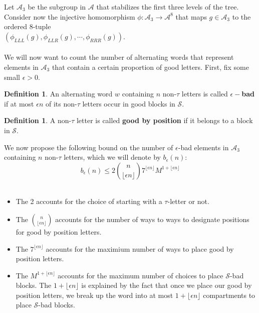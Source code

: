 \documentclass[11pt]{amsart}
\theoremstyle{definition}
\newtheorem{definition}[theorem]{Definition}
\theoremstyle{remark}
\numberwithin{equation}{section}
\begin{document}
\noindent Let $\mathcal{A}_3$ be the subgroup in $\mathcal{A}$ that stabilizes the first three levels of the tree. Consider now the injective homomorphism $\phi \colon \mathcal{A}_3 \to \mathcal{A}^{8}$ that maps $g \in \mathcal{A}_3$ to the ordered 8-tuple \\ $(\phi_{LLL}(g), \phi_{LLR}(g), \cdots, \phi_{RRR}(g))$. \\ \\
We will now want to count the number of alternating words that represent elements in $\mathcal{A}_3$ that contain a certain proportion of good letters. First, fix some small $\epsilon > 0$. 
\begin{definition}
An alternating word $w$ containing $n$ non-$\tau$ letters is called \textbf{$\epsilon-$bad} if at most $\epsilon n$ of its non-$\tau$ letters occur in good blocks in $\mathcal{S}$. 
\end{definition}
\begin{definition}
A non-$\tau$ letter is called \textbf{good by position} if it belongs to a block in $\mathcal{S}$.
\end{definition}
We now propose the following bound on the number of $\epsilon$-bad elements in $\mathcal{A}_3$ containing $n$ non-$\tau$ letters, which we will denote by $b_{\epsilon}(n)$: \\ 
$$b_{\epsilon}(n) \leq 2 \displaystyle{ n \choose \lfloor \epsilon n \rfloor } 7^{ \lfloor \epsilon n \rfloor } M^{1 + \lfloor \epsilon n \rfloor} $$ \\ 
\begin{itemize}
\item The 2 accounts for the choice of starting with a $\tau$-letter or not. \\ 
\item The $\displaystyle{ n \choose \lfloor \epsilon n \rfloor }$ accounts for the number of ways to ways to designate positions for good by position letters. \\
\item The $7^{ \lfloor \epsilon n \rfloor }$ accounts for the maximium number of ways to place good by position letters. \\ 
\item The $M^{1 + \lfloor \epsilon n \rfloor}$ accounts for the maximum number of choices to place $\mathcal{S}$-bad blocks. The $1 + \lfloor \epsilon n \rfloor$ is explained by the fact that once we place our good by position letters, we break up the word into at most $1 + \lfloor \epsilon n \rfloor$ compartments to place $\mathcal{S}$-bad blocks. \\
\end{itemize}
\end{document}
